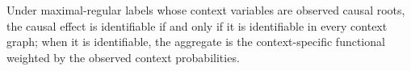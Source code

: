 Under maximal-regular labels whose context variables are observed causal roots, the causal effect is identifiable if and only if it is identifiable in every context graph; when it is identifiable, the aggregate is the context-specific functional weighted by the observed context probabilities.